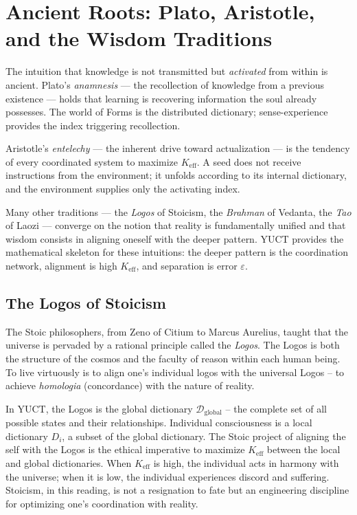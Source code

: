 \documentclass[12pt,a4paper]{article}
\begin{document}
	\section{Ancient Roots: Plato, Aristotle, and the Wisdom Traditions}
	
	The intuition that knowledge is not transmitted but \emph{activated} from within is ancient. Plato's \emph{anamnesis} --- the recollection of knowledge from a previous existence --- holds that learning is recovering information the soul already possesses. The world of Forms is the distributed dictionary; sense-experience provides the index triggering recollection.
	
	Aristotle's \emph{entelechy} --- the inherent drive toward actualization --- is the tendency of every coordinated system to maximize \(K_{\mathrm{eff}}\). A seed does not receive instructions from the environment; it unfolds according to its internal dictionary, and the environment supplies only the activating index.
	
	Many other traditions --- the \emph{Logos} of Stoicism, the \emph{Brahman} of Vedanta, the \emph{Tao} of Laozi --- converge on the notion that reality is fundamentally unified and that wisdom consists in aligning oneself with the deeper pattern. YUCT provides the mathematical skeleton for these intuitions: the deeper pattern is the coordination network, alignment is high \(K_{\mathrm{eff}}\), and separation is error \(\varepsilon\).
	
	\subsection{The Logos of Stoicism}
	
	The Stoic philosophers, from Zeno of Citium to Marcus Aurelius, taught that the universe is pervaded by a rational principle called the \emph{Logos}. The Logos is both the structure of the cosmos and the faculty of reason within each human being. To live virtuously is to align one's individual logos with the universal Logos -- to achieve \emph{homologia} (concordance) with the nature of reality.
	
	In YUCT, the Logos is the global dictionary \(\mathcal{D}_{\text{global}}\) -- the complete set of all possible states and their relationships. Individual consciousness is a local dictionary \(D_i\), a subset of the global dictionary. The Stoic project of aligning the self with the Logos is the ethical imperative to maximize \(K_{\mathrm{eff}}\) between the local and global dictionaries. When \(K_{\mathrm{eff}}\) is high, the individual acts in harmony with the universe; when it is low, the individual experiences discord and suffering. Stoicism, in this reading, is not a resignation to fate but an engineering discipline for optimizing one's coordination with reality.
	
\end{document}
